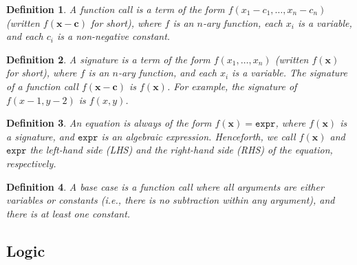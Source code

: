 \documentclass{article}
\newtheorem{definition}{Definition}
\newcommand{\expr}{\mathtt{expr}}
\begin{document}
\begin{definition}
  A \emph{function call} is a term of the form
  $f(x_{1} - c_{1}, \dots, x_{n} - c_{n})$ (written $f(\mathbf{x} - \mathbf{c})$
  for short), where $f$ is an $n$-ary function, each $x_{i}$ is a variable, and
  each $c_{i}$ is a non-negative constant.
\end{definition}

\begin{definition}
  A \emph{signature} is a term of the form $f(x_{1}, \dots, x_{n})$ (written
  $f(\mathbf{x})$ for short), where $f$ is an $n$-ary function, and each $x_{i}$
  is a variable. The signature of a function call $f(\mathbf{x} - \mathbf{c})$
  is $f(\mathbf{x})$. For example, the signature of $f(x - 1, y - 2)$ is
  $f(x, y)$.
\end{definition}

\begin{definition}
  An \emph{equation} is always of the form $f(\mathbf{x}) = \expr{}$, where
  $f(\mathbf{x})$ is a signature, and $\expr{}$ is an algebraic expression.
  Henceforth, we call $f(\mathbf{x})$ and $\expr{}$ the left-hand side (LHS) and
  the right-hand side (RHS) of the equation, respectively.
\end{definition}

\begin{definition}
  A \emph{base case} is a function call where all arguments are either variables
  or constants (i.e., there is no subtraction within any argument), and there is
  at least one constant.
\end{definition}

\subsection{Logic}

\end{document}
